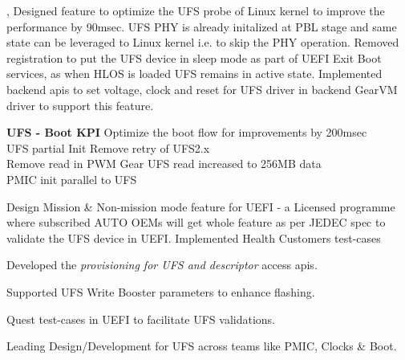 \begin{itemize}\itemsep\isep
\footnotesize {
      \item {}, Designed feature to optimize the UFS probe of Linux kernel to improve the performance by 90msec. UFS PHY is already initalized at PBL stage and same state can be leveraged to Linux kernel i.e. to skip the PHY operation. Removed registration to put the UFS device in sleep mode as part of UEFI Exit Boot services, as when HLOS is loaded UFS remains in active state. Implemented backend apis to set voltage, clock and reset for UFS driver in backend GearVM driver to support this feature.
   \item \noindent \textbf{UFS - Boot KPI} Optimize the boot flow for improvements \textemdash{} by 200msec \\
      \BAspaceBullet UFS partial Init               \BAspaceBullet Remove retry of UFS2.x \\
      \BAspaceBullet Remove read in PWM Gear        \BAspaceBullet UFS read increased to 256MB data   \\
      \BAspaceBullet PMIC init parallel to UFS
      \item \noindent Design Mission \& Non-mission mode feature for UEFI - a Licensed programme where subscribed AUTO OEMs will get whole feature as per JEDEC spec to validate the UFS device in UEFI. Implemented Health Customers test-cases 
      \item \noindent Developed the \textit{provisioning for UFS and descriptor} access apis.
      \item \noindent Supported UFS Write Booster parameters to enhance flashing.
      \item \noindent Quest test-cases in UEFI to facilitate UFS validations.
      \item \noindent Leading Design/Development for UFS across teams like PMIC, Clocks \& Boot.
}
\end{itemize}
